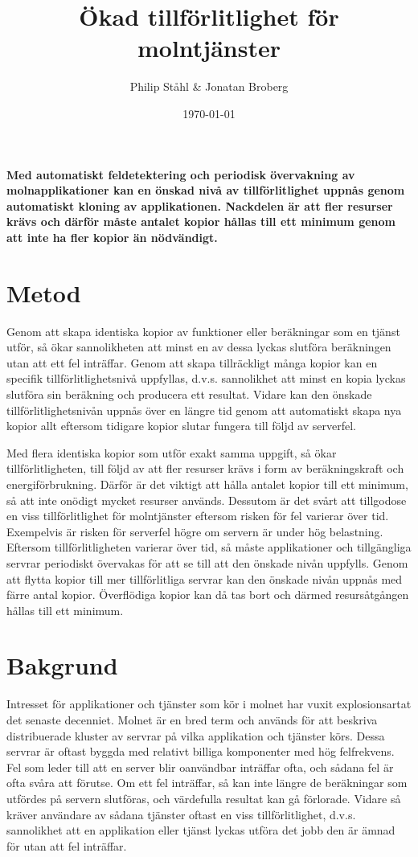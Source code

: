 \documentclass{article}
\author{
	Philip Ståhl \& Jonatan Broberg
}
\title{Ökad tillförlitlighet för molntjänster}
\date{\today}
\begin{document}
\maketitle

\begin{multicols}{2}
\noindent
\textbf{Med automatiskt feldetektering och periodisk övervakning av molnapplikationer kan en önskad nivå av tillförlitlighet uppnås genom automatiskt kloning av applikationen. Nackdelen är att fler resurser krävs och därför måste antalet kopior hållas till ett minimum genom att inte ha fler kopior än nödvändigt.}

\section*{Metod}
Genom att skapa identiska kopior av funktioner eller beräkningar som en tjänst utför, så ökar sannolikheten att minst en av dessa lyckas slutföra beräkningen utan att ett fel inträffar. Genom att skapa tillräckligt många kopior kan en specifik tillförlitlighetsnivå uppfyllas, d.v.s. sannolikhet att minst en kopia lyckas slutföra sin beräkning och producera ett resultat. Vidare kan den önskade tillförlitlighetsnivån uppnås över en längre tid genom att automatiskt skapa nya kopior allt eftersom tidigare kopior slutar fungera till följd av serverfel.

Med flera identiska kopior som utför exakt samma uppgift, så ökar tillförlitligheten, till följd av att fler resurser krävs i form av beräkningskraft och energiförbrukning. Därför är det viktigt att hålla antalet kopior till ett minimum, så att inte onödigt mycket resurser används. Dessutom är det svårt att tillgodose en viss tillförlitlighet för molntjänster eftersom risken för fel varierar över tid. Exempelvis är risken för serverfel högre om servern är under hög belastning. Eftersom tillförlitligheten varierar över tid, så måste applikationer och tillgängliga servrar periodiskt övervakas för att se till att den önskade nivån uppfylls. Genom att flytta kopior till mer tillförlitliga servrar kan den önskade nivån uppnås med färre antal kopior. Överflödiga kopior kan då tas bort och därmed resursåtgången hållas till ett minimum.

\section*{Bakgrund}
Intresset för applikationer och tjänster som kör i molnet har vuxit explosionsartat det senaste decenniet. Molnet är en bred term och används för att beskriva distribuerade kluster av servrar på vilka applikation och tjänster körs. Dessa servrar är oftast byggda med relativt billiga komponenter med hög felfrekvens. Fel som leder till att en server blir oanvändbar inträffar ofta, och sådana fel är ofta svåra att förutse. Om ett fel inträffar, så kan inte längre de beräkningar som utfördes på servern slutföras, och värdefulla resultat kan gå förlorade. Vidare så kräver användare av sådana tjänster oftast en viss tillförlitlighet, d.v.s. sannolikhet att en applikation eller tjänst lyckas utföra det jobb den är ämnad för utan att fel inträffar. 


\end{multicols}
\end{document}
